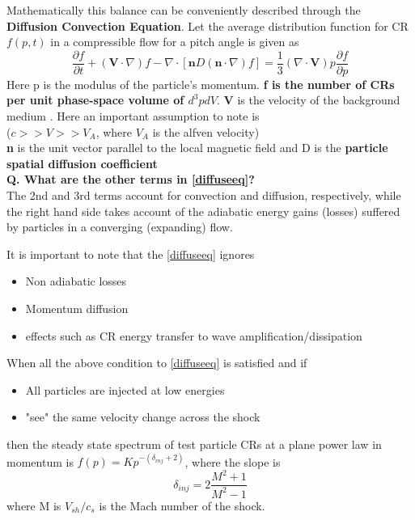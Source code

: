 \documentclass[11pt]{report}
\newcommand{\tbf}[1]{\textbf{#1}}
\newcommand{\pe}[2]{\frac{\partial{#1}}{\partial{#2}}}
\newcommand{\cbox}{tcolorbox}
\newcommand{\cc}[1]{\left({#1}\right)}
\newcommand{\rr}[1]{\left[{#1}\right]}
\begin{document}
Mathematically this balance can be conveniently described through the \tbf{Diffusion Convection Equation}.  Let the average distribution function for CR $f(p,t)$ in a compressible flow for a pitch angle is given as 
\begin{equation}\label{diffuseeq}
\pe{f}{t}+(\tbf{V}\cdot \nabla)f-\nabla\cdot \rr{\tbf{n}D(\tbf{n}\cdot \nabla)f}=\frac{1}{3}\cc{\nabla \cdot \tbf{V}}p\pe{f}{p}
\end{equation}
Here p is the modulus of the particle's momentum. \tbf{f is the number of CRs per unit phase-space volume of $d^3pdV$}. \tbf{V} is the velocity of the background medium . Here an important assumption to note is \\

($c>>V>>V_A$, where $V_A$ is the alfven velocity)\\

\tbf{n} is the unit vector parallel to the local magnetic field and D is the \tbf{particle spatial diffusion coefficient}\\

\tbf{Q. What are the other terms in \eqref{diffuseeq}?}\\
 The 2nd and 3rd terms account for convection and diffusion, respectively, while the right hand side takes account of the adiabatic energy gains (losses) suffered by particles in a converging (expanding) flow.
 
 \begin{\cbox}
 It is important to note that the \eqref{diffuseeq} ignores 
 \begin{itemize}
 \item Non adiabatic losses
 \item Momentum diffusion
 \item effects such as CR energy transfer to wave amplification/dissipation 
 \end{itemize}
 
 \end{\cbox}
When all the above condition to \eqref{diffuseeq} is satisfied and if
\begin{itemize}
\item All particles are injected at low energies
\item "see" the same velocity change across the shock
\end{itemize}
then the steady state spectrum of test particle CRs at a plane power law in momentum is $f(p)=Kp^{-(\delta_{inj}+2)}$, where the slope is
\begin{equation}
\delta_{inj}=2\frac{M^2+1}{M^2-1}
\end{equation}
where M is $V_{sh}/c_s$ is the Mach number of the shock.\\
\end{document}
